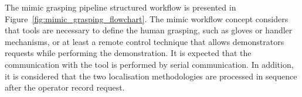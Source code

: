 \begin{figure}[h!]
\end{figure}



The mimic grasping pipeline structured workflow is presented in Figure~\ref{fig:mimic_grasping_flowchart}. The mimic workflow concept considers that tools are necessary to define the human grasping, such as gloves or handler mechanisms, or at least a remote control technique that allows demonstrators requests while performing the demonstration. It is expected that the communication with the tool is performed by serial communication. In addition, it is considered that the two localisation methodologies are processed in sequence after the operator record request. 


